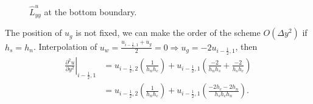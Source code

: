 \documentclass{article}
\begin{document}
\begin{figure}[H] %
  \caption{$\hat{L}^u_{yy}$ at the bottom boundary.}\label{fig:luxx-bottom}
\end{figure}

The position of $u_g$ is not fixed, we can make the order of the scheme $O(\Delta y^2)$ if $h_s=h_n$. Interpolation of $u_{w} =\frac{u_{i-\frac{1}{2},1}+u_g}{2}=0 \Rightarrow u_g=-2 u_{i-\frac{1}{2},1}$, then
\begin{equation}
\begin{aligned}
\left.\frac{\partial^2 u}{\partial y^2}\right|_{i-\frac{1}{2},1} 
& =u_{i-\frac{1}{2},2}\left(\frac{1}{h_n h_c}\right)+u_{i-\frac{1}{2},1}\left(\frac{-2}{h_n h_s}+\frac{-2}{h_s h_c}\right) \\
& =u_{i-\frac{1}{2},2}\left(\frac{1}{h_n h_c}\right)+u_{i-\frac{1}{2},1}\left(\frac{-2 h_c-2 h_n}{h_s h_c h_n}\right).
\end{aligned}
\end{equation}
\end{document}
